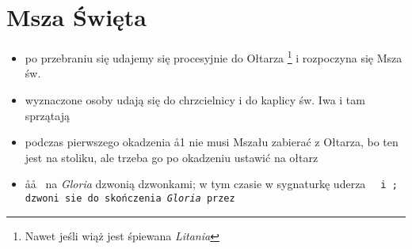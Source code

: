\section{Msza Święta}

\begin{itemize}
	\item po przebraniu się udajemy się procesyjnie do Ołtarza \footnote{Nawet
		      jeśli wiąż jest śpiewana \textit{Litania}} i rozpoczyna się Msza
	      św.
	\item wyznaczone osoby udają się do chrzcielnicy i do kaplicy św. Iwa i tam
	      sprzątają
	\item podczas pierwszego okadzenia \aa1 nie musi Mszału zabierać z Ołtarza,
	      bo ten jest na stoliku, ale trzeba go po okadzeniu ustawić na ołtarz
	\item \aa\aa~ na \textit{Gloria} dzwonią dzwonkami; w tym czasie w
	      sygnaturkę uderza \tt~ i \zz; dzwoni sie do skończenia
	      \textit{Gloria} przez \ii
\end{itemize}